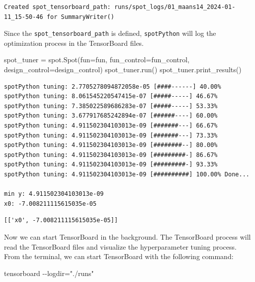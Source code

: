 \documentclass[
  letterpaper,
  DIV=11,
  numbers=noendperiod]{scrreprt}
\newenvironment{Shaded}{\begin{snugshade}}{\end{snugshade}}
\newcommand{\NormalTok}[1]{\textcolor[rgb]{0.00,0.23,0.31}{#1}}
\newcommand{\OperatorTok}[1]{\textcolor[rgb]{0.37,0.37,0.37}{#1}}
\begin{document}
\begin{verbatim}
Created spot_tensorboard_path: runs/spot_logs/01_maans14_2024-01-11_15-50-46 for SummaryWriter()
\end{verbatim}

Since the \texttt{spot\_tensorboard\_path} is defined,
\texttt{spotPython} will log the optimization process in the TensorBoard
files.

\begin{Shaded}
\begin{Highlighting}[]
\NormalTok{spot\_tuner }\OperatorTok{=}\NormalTok{ spot.Spot(fun}\OperatorTok{=}\NormalTok{fun,}
\NormalTok{                   fun\_control}\OperatorTok{=}\NormalTok{fun\_control,}
\NormalTok{                   design\_control}\OperatorTok{=}\NormalTok{design\_control)}
\NormalTok{spot\_tuner.run()}
\NormalTok{spot\_tuner.print\_results()}
\end{Highlighting}
\end{Shaded}

\begin{verbatim}
spotPython tuning: 2.7705278094872058e-05 [####------] 40.00% 
spotPython tuning: 8.061545220547415e-07 [#####-----] 46.67% 
spotPython tuning: 7.385022589686283e-07 [#####-----] 53.33% 
spotPython tuning: 3.677917685242894e-07 [######----] 60.00% 
spotPython tuning: 4.911502304103013e-09 [#######---] 66.67% 
spotPython tuning: 4.911502304103013e-09 [#######---] 73.33% 
spotPython tuning: 4.911502304103013e-09 [########--] 80.00% 
spotPython tuning: 4.911502304103013e-09 [#########-] 86.67% 
spotPython tuning: 4.911502304103013e-09 [#########-] 93.33% 
spotPython tuning: 4.911502304103013e-09 [##########] 100.00% Done...

min y: 4.911502304103013e-09
x0: -7.008211115615035e-05
\end{verbatim}

\begin{verbatim}
[['x0', -7.008211115615035e-05]]
\end{verbatim}

Now we can start TensorBoard in the background. The TensorBoard process
will read the TensorBoard files and visualize the hyperparameter tuning
process. From the terminal, we can start TensorBoard with the following
command:

\begin{Shaded}
\begin{Highlighting}[]
\NormalTok{tensorboard {-}{-}logdir="./runs"}
\end{Highlighting}
\end{Shaded}
\end{document}
